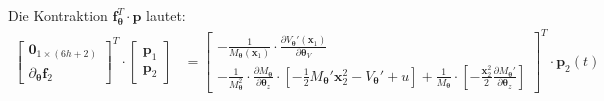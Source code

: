 \documentclass[a4paper, 12pt]{scrartcl}
\begin{document}
Die Kontraktion $\bm{f}_{\bm{\theta}}^T \cdot \bm{p}$ lautet:
\begin{align*}
    \begin{bmatrix}
        \bm{0}_{1 \times (6h+2)} \\
        \partial_{\bm{\theta}} \bm{f}_2 
    \end{bmatrix}^T
    \cdot 
    \begin{bmatrix}
        \bm{p}_1 \\
        \bm{p}_2
    \end{bmatrix}
    &=
    \begin{bmatrix}
        - \frac{1}{M_{\bm{\theta}}(\bm{x}_1)} 
        \cdot 
        \frac{\partial V_{\bm{\theta}}'(\bm{x}_1)}{\partial \bm{\theta}_V}
        \\
        -\frac{1}{M_{\bm{\theta}}^2} \cdot 
        \frac{\partial M_{\bm{\theta}}}{\partial \bm{\theta}_z}
        \cdot 
        \left[
            -\frac{1}{2} M_{\bm{\theta}}' \bm{x}_2^2 - V_{\bm{\theta}}' + u
        \right]
        +
        \frac{1}{M_{\bm{\theta}}}
        \cdot 
        \left[
            -\frac{\bm{x}_2^2}{2} \frac{\partial M_{\bm{\theta}}'}{\partial \bm{\theta}_z}
        \right]
    \end{bmatrix}^T
    \cdot \bm{p}_2(t)
\end{align*}
\end{document}
